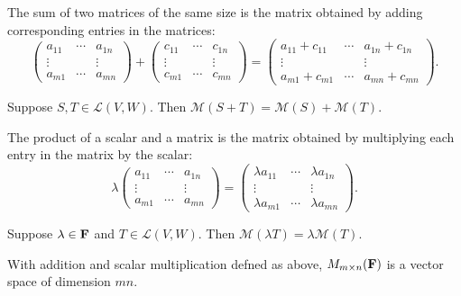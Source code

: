 \begin{definition}
The sum of two matrices of the same size is the matrix obtained by adding corresponding entries in the matrices:
\[\begin{pmatrix}
a_{11}&\cdots&a_{1n}\\
\vdots&&\vdots\\
a_{m1}&\cdots&a_{mn}
\end{pmatrix}+
\begin{pmatrix}
c_{11}&\cdots&c_{1n}\\
\vdots&&\vdots\\
c_{m1}&\cdots&c_{mn}
\end{pmatrix}=
\begin{pmatrix}
a_{11}+c_{11}&\cdots&a_{1n}+c_{1n}\\
\vdots&&\vdots\\
a_{m1}+c_{m1}&\cdots&a_{mn}+c_{mn}
\end{pmatrix}.\]
\end{definition}

\begin{proposition}
Suppose $S,T\in\mathcal{L}(V,W)$. Then $\mathcal{M}(S+T)=\mathcal{M}(S)+\mathcal{M}(T)$.
\end{proposition}

\begin{definition}
The product of a scalar and a matrix is the matrix obtained by multiplying each entry in the matrix by the scalar:
\[\lambda\begin{pmatrix}
a_{11}&\cdots&a_{1n}\\
\vdots&&\vdots\\
a_{m1}&\cdots&a_{mn}
\end{pmatrix}=
\begin{pmatrix}
\lambda a_{11}&\cdots&\lambda a_{1n}\\
\vdots&&\vdots\\
\lambda a_{m1}&\cdots&\lambda a_{mn}
\end{pmatrix}.\]
\end{definition}

\begin{proposition}
Suppose $\lambda\in\mathbf F$ and $T\in\mathcal{L}(V,W)$. Then $\mathcal{M}(\lambda T)=\lambda \mathcal{M}(T)$.
\end{proposition}

\begin{proposition}
With addition and scalar multiplication
defned as above, $M_{m\times n}(\mathbf F)$ is a vector space of dimension $mn$.
\end{proposition}

